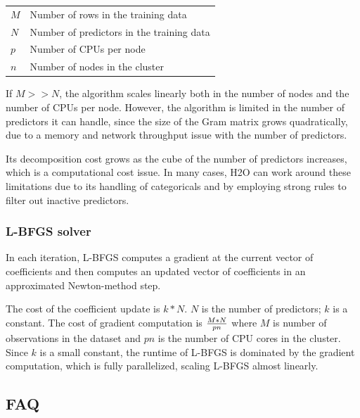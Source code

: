     \begin{tabular}{ l l }

    $M$ & Number of rows in the training data \\
    $N$ & Number of predictors in the training data \\
    $p$ & Number of CPUs per node \\
    $n$ & Number of nodes in the cluster \\
    \end{tabular}


If $M>>N$, the algorithm scales linearly both in the number of nodes and the number of CPUs per node. However,
the algorithm is limited in the number of predictors it can handle, since the size of the Gram matrix grows
quadratically, due to a memory and network throughput issue with the number of predictors. 

Its decomposition
cost grows as the cube of the number of predictors increases, which is a computational cost issue. In many cases, H2O can work around these limitations due to its handling of categoricals and by employing strong rules to filter out inactive predictors.

\subsubsection{L-BFGS solver}
In each iteration, L-BFGS computes a gradient at the current vector of coefficients and then computes an updated vector of coefficients in an approximated Newton-method step. 

The cost of the coefficient update is $k*N$. $N$ is the number of predictors; $k$ is a constant. The cost of gradient computation is $M*N\over pn$ where $M$ is number of observations in the dataset and $pn$ is the number of CPU cores in the cluster. Since $k$ is a small constant, the runtime of L-BFGS is dominated by the gradient computation, which is fully parallelized, scaling L-BFGS almost linearly. 

\subsection{FAQ}

